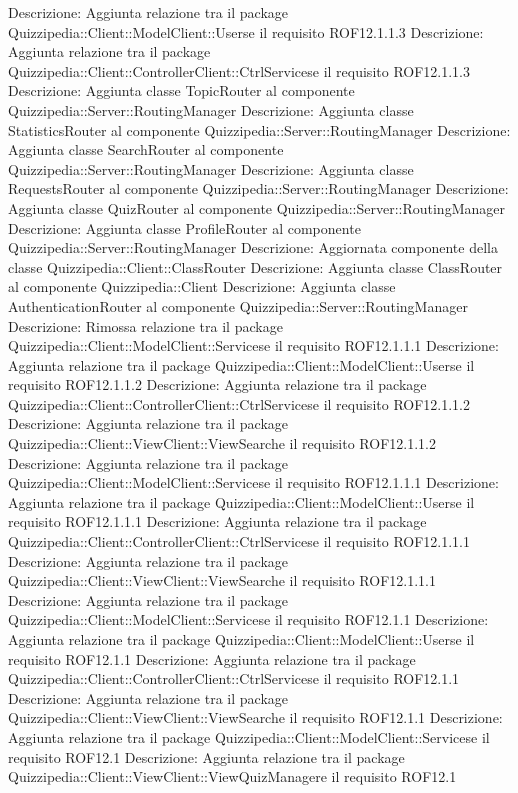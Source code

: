 Descrizione: Aggiunta relazione tra il package Quizzipedia::Client::ModelClient::Userse il requisito ROF12.1.1.3 
Descrizione: Aggiunta relazione tra il package Quizzipedia::Client::ControllerClient::CtrlServicese il requisito ROF12.1.1.3 
Descrizione: Aggiunta classe TopicRouter al componente Quizzipedia::Server::RoutingManager 
Descrizione: Aggiunta classe StatisticsRouter al componente Quizzipedia::Server::RoutingManager 
Descrizione: Aggiunta classe SearchRouter al componente Quizzipedia::Server::RoutingManager 
Descrizione: Aggiunta classe RequestsRouter al componente Quizzipedia::Server::RoutingManager 
Descrizione: Aggiunta classe QuizRouter al componente Quizzipedia::Server::RoutingManager 
Descrizione: Aggiunta classe ProfileRouter al componente Quizzipedia::Server::RoutingManager 
Descrizione: Aggiornata componente della classe Quizzipedia::Client::ClassRouter 
Descrizione: Aggiunta classe ClassRouter al componente Quizzipedia::Client 
Descrizione: Aggiunta classe AuthenticationRouter al componente Quizzipedia::Server::RoutingManager 
Descrizione: Rimossa relazione tra il package Quizzipedia::Client::ModelClient::Servicese il requisito ROF12.1.1.1 
Descrizione: Aggiunta relazione tra il package Quizzipedia::Client::ModelClient::Userse il requisito ROF12.1.1.2 
Descrizione: Aggiunta relazione tra il package Quizzipedia::Client::ControllerClient::CtrlServicese il requisito ROF12.1.1.2 
Descrizione: Aggiunta relazione tra il package Quizzipedia::Client::ViewClient::ViewSearche il requisito ROF12.1.1.2 
Descrizione: Aggiunta relazione tra il package Quizzipedia::Client::ModelClient::Servicese il requisito ROF12.1.1.1 
Descrizione: Aggiunta relazione tra il package Quizzipedia::Client::ModelClient::Userse il requisito ROF12.1.1.1 
Descrizione: Aggiunta relazione tra il package Quizzipedia::Client::ControllerClient::CtrlServicese il requisito ROF12.1.1.1 
Descrizione: Aggiunta relazione tra il package Quizzipedia::Client::ViewClient::ViewSearche il requisito ROF12.1.1.1 
Descrizione: Aggiunta relazione tra il package Quizzipedia::Client::ModelClient::Servicese il requisito ROF12.1.1 
Descrizione: Aggiunta relazione tra il package Quizzipedia::Client::ModelClient::Userse il requisito ROF12.1.1 
Descrizione: Aggiunta relazione tra il package Quizzipedia::Client::ControllerClient::CtrlServicese il requisito ROF12.1.1 
Descrizione: Aggiunta relazione tra il package Quizzipedia::Client::ViewClient::ViewSearche il requisito ROF12.1.1 
Descrizione: Aggiunta relazione tra il package Quizzipedia::Client::ModelClient::Servicese il requisito ROF12.1 
Descrizione: Aggiunta relazione tra il package Quizzipedia::Client::ViewClient::ViewQuizManagere il requisito ROF12.1 
